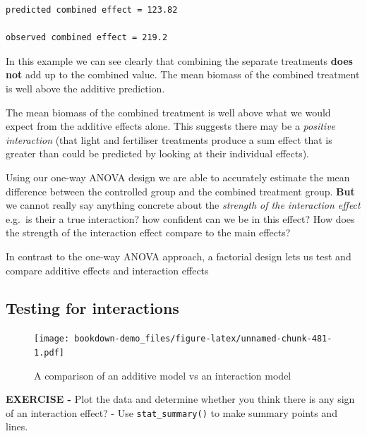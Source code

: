 \documentclass[
]{book}
\begin{document}
\begin{verbatim}
predicted combined effect = 123.82

observed combined effect = 219.2
\end{verbatim}

In this example we can see clearly that combining the separate treatments \textbf{does not} add up to the combined value. The mean biomass of the combined treatment is well above the additive prediction.

The mean biomass of the combined treatment is well above what we would expect from the additive effects alone. This suggests there may be a \emph{positive interaction} (that light and fertiliser treatments produce a sum effect that is greater than could be predicted by looking at their individual effects).

Using our one-way ANOVA design we are able to accurately estimate the mean difference between the controlled group and the combined treatment group. \textbf{But} we cannot really say anything concrete about the \emph{strength of the interaction effect} e.g.~is their a true interaction? how confident can we be in this effect? How does the strength of the interaction effect compare to the main effects?

In contrast to the one-way ANOVA approach, a factorial design lets us test and compare additive effects and interaction effects

\hypertarget{testing-for-interactions}{%
\subsection{Testing for interactions}\label{testing-for-interactions}}

\begin{figure}
\centering
\texttt{[image: bookdown-demo\_files/figure-latex/unnamed-chunk-481-1.pdf]}
\caption{\label{fig:unnamed-chunk-481}A comparison of an additive model vs an interaction model}
\end{figure}

\textbf{EXERCISE -} Plot the data and determine whether you think there is any sign of an interaction effect? - Use \texttt{stat\_summary()} to make summary points and lines.
\end{document}
